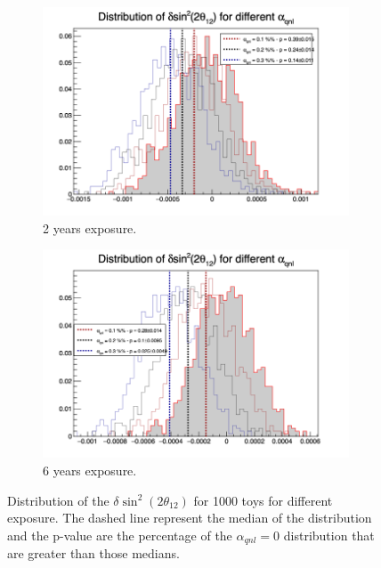 \documentclass[../main.tex]{subfiles}
\begin{document}
\begin{figure}[th]
  \begin{subfigure}[t]{0.48\linewidth}
    \includegraphics[width=\linewidth]{images/joint_fit/stat_tests/chi2_delta_2y.png}
    \caption{2 years exposure.}
  \end{subfigure}
  \begin{subfigure}[t]{0.48\linewidth}
    \includegraphics[width=\linewidth]{images/joint_fit/stat_tests/chi2_delta_6y.png}
    \caption{6 years exposure.}
  \end{subfigure}
  \caption{Distribution of the $\delta \sin^2(2\theta_{12})$ for 1000 toys for different exposure. The dashed line represent the median of the distribution and the p-value are the percentage of the $\alpha_{qnl} = 0$ distribution that are greater than those medians.}
  \label{fig:joint_fit:chi2_delta}
\end{figure}
\end{document}

